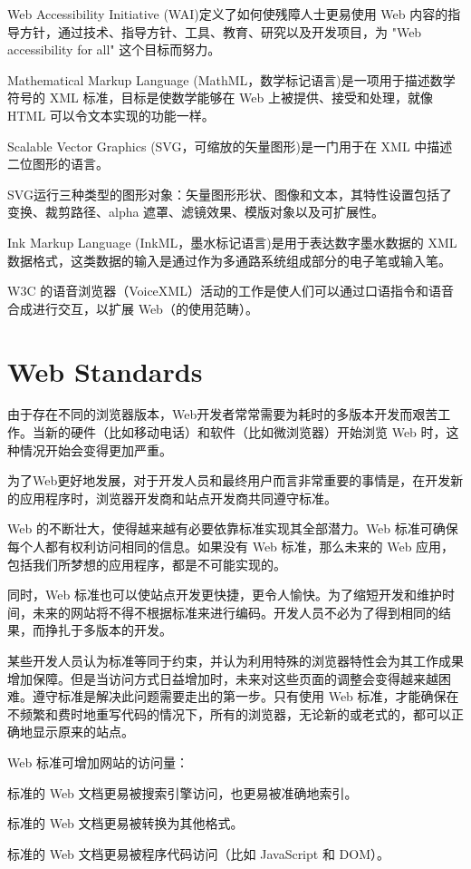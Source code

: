 Web Accessibility Initiative (WAI)定义了如何使残障人士更易使用 Web 内容的指导方针，通过技术、指导方针、工具、教育、研究以及开发项目，为 "Web accessibility for all" 这个目标而努力。

Mathematical Markup Language (MathML，数学标记语言)是一项用于描述数学符号的 XML 标准，目标是使数学能够在 Web 上被提供、接受和处理，就像 HTML 可以令文本实现的功能一样。

Scalable Vector Graphics (SVG，可缩放的矢量图形)是一门用于在 XML 中描述二位图形的语言。

SVG运行三种类型的图形对象：矢量图形形状、图像和文本，其特性设置包括了变换、裁剪路径、alpha 遮罩、滤镜效果、模版对象以及可扩展性。

Ink Markup Language (InkML，墨水标记语言)是用于表达数字墨水数据的 XML 数据格式，这类数据的输入是通过作为多通路系统组成部分的电子笔或输入笔。


W3C 的语音浏览器（VoiceXML）活动的工作是使人们可以通过口语指令和语音合成进行交互，以扩展 Web（的使用范畴）。




\chapter{Web Standards}


由于存在不同的浏览器版本，Web开发者常常需要为耗时的多版本开发而艰苦工作。当新的硬件（比如移动电话）和软件（比如微浏览器）开始浏览 Web 时，这种情况开始会变得更加严重。

为了Web更好地发展，对于开发人员和最终用户而言非常重要的事情是，在开发新的应用程序时，浏览器开发商和站点开发商共同遵守标准。

Web 的不断壮大，使得越来越有必要依靠标准实现其全部潜力。Web 标准可确保每个人都有权利访问相同的信息。如果没有 Web 标准，那么未来的 Web 应用，包括我们所梦想的应用程序，都是不可能实现的。

同时，Web 标准也可以使站点开发更快捷，更令人愉快。为了缩短开发和维护时间，未来的网站将不得不根据标准来进行编码。开发人员不必为了得到相同的结果，而挣扎于多版本的开发。

某些开发人员认为标准等同于约束，并认为利用特殊的浏览器特性会为其工作成果增加保障。但是当访问方式日益增加时，未来对这些页面的调整会变得越来越困难。遵守标准是解决此问题需要走出的第一步。只有使用 Web 标准，才能确保在不频繁和费时地重写代码的情况下，所有的浏览器，无论新的或老式的，都可以正确地显示原来的站点。

Web 标准可增加网站的访问量：

\begin{compactitem}
\item 标准的 Web 文档更易被搜索引擎访问，也更易被准确地索引。
\item 标准的 Web 文档更易被转换为其他格式。
\item 标准的 Web 文档更易被程序代码访问（比如 JavaScript 和 DOM）。
\end{compactitem}


